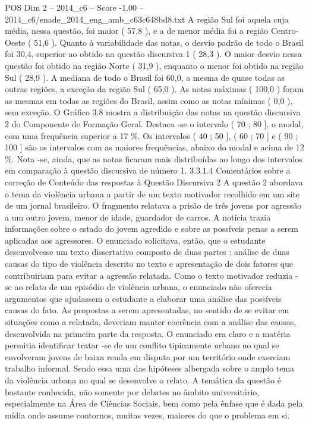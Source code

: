 \begin{textsample}{POS Dim 2 – 2014\_c6 – Score -1.00 – 2014\_c6/enade\_2014\_eng\_amb\_c63c648bd8.txt}
A região Sul foi aquela cuja média, nessa questão, foi maior ( 57,8 ), e a de menor média foi a região Centro-Oeste ( 51,6 ).
Quanto à variabilidade das notas, o desvio padrão de todo o Brasil foi 30,4, superior ao obtido na questão discursiva 1 ( 28,3 ).
O maior desvio nessa questão foi obtido na região Norte ( 31,9 ), enquanto o menor foi obtido na região Sul ( 28,9 ).
A mediana de todo o Brasil foi 60,0, a mesma de quase todas as outras regiões, a exceção da região Sul ( 65,0 ).
As notas máximas ( 100,0 ) foram as mesmas em todas as regiões do Brasil, assim como as notas mínimas ( 0,0 ), sem exceção.
O Gráfico 3.8 mostra a distribuição das notas na questão discursiva 2 do Componente de Formação Geral.
Destaca -se o intervalo ( 70 ; 80 ], o modal, com uma frequência superior a 17 \%.
Os intervalos ( 40 ; 50 ], ( 60 ; 70 ] e ( 90 ; 100 ] são os intervalos com as maiores frequências, abaixo do modal e acima de 12 \%.
Nota -se, ainda, que as notas ficaram mais distribuídas ao longo dos intervalos em comparação à questão discursiva de número 1. 3.3.1.4 Comentários sobre a correção de Conteúdo das respostas à Questão Discursiva 2 A questão 2 abordava o tema da violência urbana a partir de um texto motivador recolhido em um site de um jornal brasileiro.
O fragmento relatava a prisão de três jovens por agressão a um outro jovem, menor de idade, guardador de carros.
A notícia trazia informações sobre o estado do jovem agredido e sobre as possíveis penas a serem aplicadas aos agressores.
O enunciado solicitava, então, que o estudante desenvolvesse um texto dissertativo composto de duas partes : análise de duas causas do tipo de violência descrito no texto e apresentação de dois fatores que contribuiriam para evitar a agressão relatada.
Como o texto motivador reduzia -se ao relato de um episódio de violência urbana, o enunciado não oferecia argumentos que ajudassem o estudante a elaborar uma análise das possíveis causas do fato.
As propostas a serem apresentadas, no sentido de se evitar em situações como a relatada, deveriam manter coerência com a análise das causas, desenvolvida na primeira parte da resposta.
O enunciado era claro e a matéria permitia identificar tratar -se de um conflito tipicamente urbano no qual se envolveram jovens de baixa renda em disputa por um território onde exerciam trabalho informal.
Sendo essa uma das hipóteses albergada sobre o amplo tema da violência urbana no qual se desenvolve o relato.
A temática da questão é bastante conhecida, não somente por debates no âmbito universitário, especialmente na Área de Ciências Sociais, bem como pela ênfase que é dada pela mídia onde assume contornos, muitas vezes, maiores do que o problema em si.

\end{textsample}
